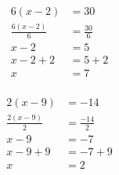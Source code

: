 \documentclass[12pt]{article}
\newcounter{minipagecount}
\begin{document}
\begin{multicols}{2}
\begin{minipage}[t]{0.45\textwidth}
    \raggedright %
    \begin{align*} %
        6(x - 2) &= 30\\
        \frac{6(x-2)}{6} &= \frac{30}{6}\\
        x - 2 &= 5\\
        x - 2 + 2 &= 5 + 2\\
        x &= 7\\
    \end{align*}
\end{minipage} %
\noindent{(\theminipagecount)}\hspace{0.1mm} %
\begin{minipage}[t]{0.45\textwidth} %
    \vspace{-26pt}  %
    \raggedright %
    \begin{align*} %
        2(x - 9) &= -14\\
        \frac{2(x-9)}{2} &= \frac{-14}{2}\\
        x - 9 &= -7\\
        x - 9 + 9 &= -7 + 9\\
        x &= 2\\
    \end{align*}
\end{minipage} %
\noindent{(\theminipagecount)}\hspace{0.1mm} %
\begin{minipage}[t]{0.45\textwidth} %
    \vspace{-26pt}  %

\end{minipage}
\end{multicols}
\end{document}
